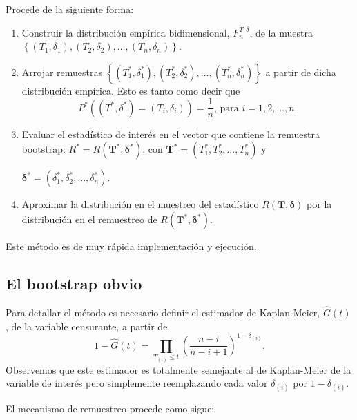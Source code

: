 \documentclass[]{book}
\theoremstyle{definition}
\theoremstyle{definition}
\theoremstyle{definition}
\theoremstyle{remark}
\begin{document}
Procede de la siguiente forma:

\begin{enumerate}
\def\labelenumi{\arabic{enumi}.}
\item
  Construir la distribución empírica bidimensional, \(F_n^{T,\delta }\),
  de la muestra
  \(\left\{ \left( T_1,\delta _1 \right), \left( T_2,\delta _2 \right), \ldots, \left( T_n,\delta _n \right) \right\}\).
\item
  Arrojar remuestras
  \(\left\{ \left( T_1^{\ast},\delta _1^{\ast} \right), \left( T_2^{\ast},\delta _2^{\ast} \right), \ldots, \left( T_n^{\ast},\delta _n^{\ast} \right) \right\}\)
  a partir de dicha distribución empírica. Esto es tanto como decir
  que\[P^{\ast}\left( \left( T^{\ast},\delta^{\ast} \right) =\left( T_i,\delta
  _i \right) \right) =\frac{1}{n}\text{, para }i=1,2,\ldots ,n\text{.}\]
\item
  Evaluar el estadístico de interés en el vector que contiene la
  remuestra bootstrap:
  \(R^{\ast}=R\left( \mathbf{T}^{\ast}, \boldsymbol{\delta}^{\ast} \right)\),
  con
  \(\mathbf{T}^{\ast} =\left( T_1^{\ast},T_2^{\ast},\ldots ,T_n^{\ast} \right)\)
  y

  \(\boldsymbol{\delta}^{\ast}=\left( \delta _1^{\ast},\delta _2^{\ast},\ldots ,\delta _n^{\ast} \right)\).
\item
  Aproximar la distribución en el muestreo del estadístico
  \(R\left( \mathbf{T}, \boldsymbol{\delta} \right)\) por la
  distribución en el remuestreo de
  \(R\left( \mathbf{T}^{\ast},\boldsymbol{\delta}^{\ast} \right)\).
\end{enumerate}

Este método es de muy rápida implementación y ejecución.

\subsection{El bootstrap obvio}\label{cap8-obvio}

Para detallar el método es necesario definir el estimador de
Kaplan-Meier, \(\hat{G}\left( t \right)\), de la variable censurante, a
partir
de\[1-\hat{G}\left( t \right) =\prod_{T_{(i)}\leq t}\left( \frac{n-i
}{n-i+1} \right)^{1-\delta _{(i)}}.\] Observemos que este estimador es
totalmente semejante al de Kaplan-Meier de la variable de interés pero
simplemente reemplazando cada valor \(\delta _{(i)}\) por
\(1-\delta _{(i)}\).

El mecanismo de remuestreo procede como sigue:
\end{document}
